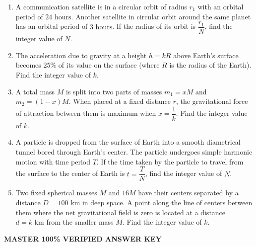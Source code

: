 \documentclass[11pt,a4paper]{article}
\begin{document}
\begin{enumerate}[label=\textbf{\arabic*.},leftmargin=18pt,itemsep=12pt,resume]

  \item A communication satellite is in a circular orbit of radius $r_1$ with an orbital period of $24\text{ hours}$. Another satellite in circular orbit around the same planet has an orbital period of $3\text{ hours}$. If the radius of its orbit is $\dfrac{r_1}{N}$, find the integer value of $N$.

  \item The acceleration due to gravity at a height $h = k R$ above Earth's surface becomes $25\%$ of its value on the surface (where $R$ is the radius of the Earth). Find the integer value of $k$.

  \item A total mass $M$ is split into two parts of masses $m_1 = x M$ and $m_2 = (1 - x)M$. When placed at a fixed distance $r$, the gravitational force of attraction between them is maximum when $x = \dfrac{1}{k}$. Find the integer value of $k$.

  \item A particle is dropped from the surface of Earth into a smooth diametrical tunnel bored through Earth's center. The particle undergoes simple harmonic motion with time period $T$. If the time taken by the particle to travel from the surface to the center of Earth is $t = \dfrac{T}{N}$, find the integer value of $N$.

  \item Two fixed spherical masses $M$ and $16M$ have their centers separated by a distance $D = 100\text{ km}$ in deep space. A point along the line of centers between them where the net gravitational field is zero is located at a distance $d = k\text{ km}$ from the smaller mass $M$. Find the integer value of $k$.

\end{enumerate}

\newpage

\begin{tcolorbox}[sectionbanner]
  {\large \textbf{\textsf{MASTER 100\% VERIFIED ANSWER KEY}}}
\end{tcolorbox}
\vspace{4pt}
\end{document}
